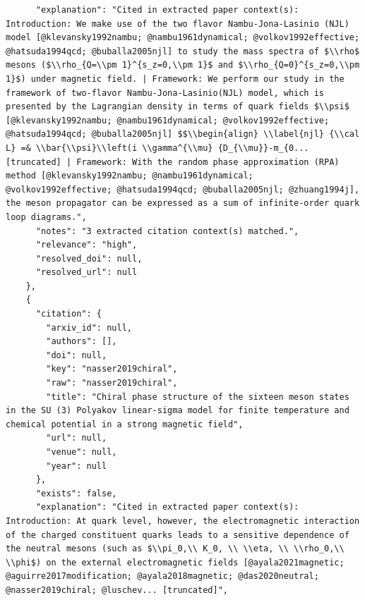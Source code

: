 \documentclass[11pt]{article}
\begin{document}
\begin{verbatim}
      "explanation": "Cited in extracted paper context(s): Introduction: We make use of the two flavor Nambu-Jona-Lasinio (NJL) model [@klevansky1992nambu; @nambu1961dynamical; @volkov1992effective; @hatsuda1994qcd; @buballa2005njl] to study the mass spectra of $\\rho$ mesons ($\\rho_{Q=\\pm 1}^{s_z=0,\\pm 1}$ and $\\rho_{Q=0}^{s_z=0,\\pm 1}$) under magnetic field. | Framework: We perform our study in the framework of two-flavor Nambu-Jona-Lasinio(NJL) model, which is presented by the Lagrangian density in terms of quark fields $\\psi$ [@klevansky1992nambu; @nambu1961dynamical; @volkov1992effective; @hatsuda1994qcd; @buballa2005njl] $$\\begin{align} \\label{njl} {\\cal L} =& \\bar{\\psi}\\left(i \\gamma^{\\mu} {D_{\\mu}}-m_{0... [truncated] | Framework: With the random phase approximation (RPA) method [@klevansky1992nambu; @nambu1961dynamical; @volkov1992effective; @hatsuda1994qcd; @buballa2005njl; @zhuang1994j], the meson propagator can be expressed as a sum of infinite-order quark loop diagrams.",
      "notes": "3 extracted citation context(s) matched.",
      "relevance": "high",
      "resolved_doi": null,
      "resolved_url": null
    },
    {
      "citation": {
        "arxiv_id": null,
        "authors": [],
        "doi": null,
        "key": "nasser2019chiral",
        "raw": "nasser2019chiral",
        "title": "Chiral phase structure of the sixteen meson states in the SU (3) Polyakov linear-sigma model for finite temperature and chemical potential in a strong magnetic field",
        "url": null,
        "venue": null,
        "year": null
      },
      "exists": false,
      "explanation": "Cited in extracted paper context(s): Introduction: At quark level, however, the electromagnetic interaction of the charged constituent quarks leads to a sensitive dependence of the neutral mesons (such as $\\pi_0,\\ K_0, \\ \\eta, \\ \\rho_0,\\ \\phi$) on the external electromagnetic fields [@ayala2021magnetic; @aguirre2017modification; @ayala2018magnetic; @das2020neutral; @nasser2019chiral; @luschev... [truncated]",

\end{verbatim}
\end{document}
